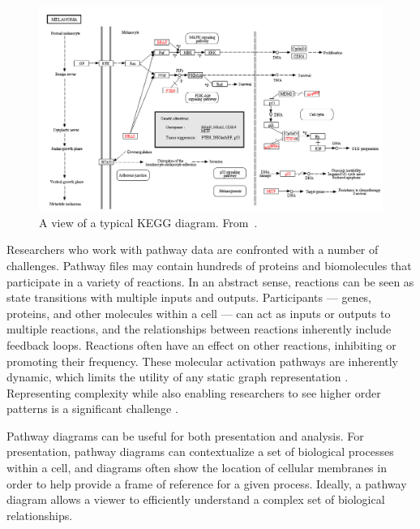 \documentclass{egpubl}
\begin{document}
\begin{figure}[htb]
  \centering
  \includegraphics[width=\linewidth]{figures/kegg2}
  \caption{\label{fig:kvik} A view of a typical KEGG diagram. From~\cite{Fjukstad2014kvik}.}
\end{figure}


Researchers who work with pathway data are confronted with a number of challenges.
Pathway files may contain hundreds of proteins and biomolecules that participate in a variety of reactions.
In an abstract sense, reactions can be seen as state transitions with multiple inputs and outputs.
Participants --- genes, proteins, and other molecules within a cell --- can act as inputs or outputs to multiple reactions, and the relationships between reactions inherently include feedback loops.
Reactions often have an effect on other reactions, inhibiting or promoting their frequency.
These molecular activation pathways are inherently dynamic, which limits the utility of any static graph representation \cite{kitano2002systems}.
Representing complexity while also enabling researchers to see higher order patterns is a significant challenge \cite{saraiya2005visualizing}.


Pathway diagrams can be useful for both presentation and analysis.
For presentation, pathway diagrams can contextualize a set of biological processes within a cell, and diagrams often show the location of cellular membranes in order to help provide a frame of reference for a given process.
Ideally, a pathway diagram allows a viewer to efficiently understand a complex set of biological relationships.

\end{document}
